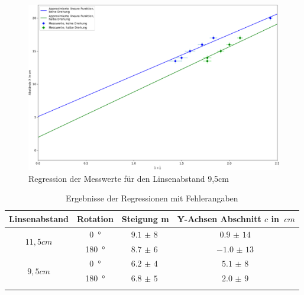 \begin{figure}[h!]{}
    \begin{center}
        \includegraphics[scale=0.4]{./fig/Abbe_Reg_Messreihe2_Plot.pdf}
        \caption{Regression der Messwerte für den Linsenabstand 9,5cm}
        \label{fig:Abbe-Regress-S2}
    \end{center}
\end{figure}


\clearpage

\begin{table}[h!]
    \begin{center}
        \caption{Ergebnisse der Regressionen mit Fehlerangaben}
        \begin{tabular}{cccc}
            \hline
            Linsenabstand   & Rotation   & Steigung m   & Y-Achsen Abschnitt $c$ in $\SI{}{cm}$\\
            \hline
            
            \multirow{2}{*}{$11,5cm$} & \SI{0}{\degree}   & $\SI{9,1(8)}{}$   & $\SI{0,9(14)}{}$ \\
                                    & \SI{180}{\degree} & $\SI{8,7(6)}{}$   & $\SI{-1,0(13)}{}$ \\
            \hline
            \multirow{2}{*}{$9,5cm$}  & \SI{0}{\degree}   & $\SI{6,2(4)}{}$ & $\SI{5,1(8)}{}$ \\
                                    & \SI{180}{\degree} & $\SI{6,8(5)}{}$  & $\SI{2,0(9)}{}$ \\
            \hline
            \label{tab:abbe-Regression-S1}
        \end{tabular}
    \end{center}
\end{table}

